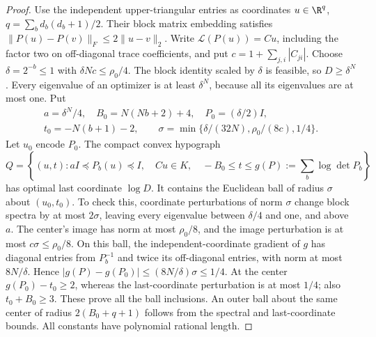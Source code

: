 \begin{proof}
Use the independent upper-triangular entries as coordinates
$u\in\R^q$, $q=\sum_bd_b(d_b+1)/2$. Their block matrix embedding
satisfies $\|P(u)-P(v)\|_F\le2\|u-v\|_2$. Write
$\mathcal L(P(u))=Cu$, including the factor two on off-diagonal trace
coefficients, and put $c=1+\sum_{j,i}|C_{ji}|$. Choose
$\delta=2^{-b}\le1$ with $\delta Nc\le\rho_0/4$. The block identity
scaled by $\delta$ is feasible, so $D\ge\delta^N$. Every eigenvalue
of an optimizer is at least $\delta^N$, because all its eigenvalues
are at most one. Put
\[
 \begin{gathered}
 a=\delta^N/4,\quad B_0=N(Nb+2)+4,\quad P_0=(\delta/2)I,\\
 t_0=-N(b+1)-2,\qquad
 \sigma=\min\{\delta/(32N),\rho_0/(8c),1/4\}.
 \end{gathered}
\]
Let $u_0$ encode $P_0$. The compact convex hypograph
\begin{equation}\label{eq:logdet-hypograph}
 Q=\left\{(u,t):aI\preceq P_b(u)\preceq I,\quad Cu\in K,\quad
                -B_0\le t\le g(P):=\sum_b\log\det P_b\right\}
\end{equation}
has optimal last coordinate $\log D$. It contains the Euclidean ball
of radius $\sigma$ about $(u_0,t_0)$. To check this, coordinate
perturbations of norm $\sigma$ change block spectra by at most
$2\sigma$, leaving every eigenvalue between $\delta/4$ and one, and
above $a$. The center's image has norm at most $\rho_0/8$, and the
image perturbation is at most $c\sigma\le\rho_0/8$. On this ball,
the independent-coordinate gradient of $g$ has diagonal entries from
$P_b^{-1}$ and twice its off-diagonal entries, with norm at most
$8N/\delta$. Hence
$|g(P)-g(P_0)|\le(8N/\delta)\sigma\le1/4$. At the center
$g(P_0)-t_0\ge2$, whereas the last-coordinate perturbation is at most
$1/4$; also $t_0+B_0\ge3$. These prove all the ball inclusions.
An outer ball about the same center of radius $2(B_0+q+1)$ follows
from the spectral and last-coordinate bounds. All constants have
polynomial rational length.


\end{proof}
